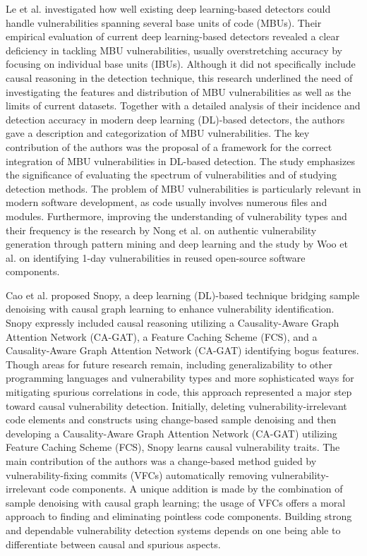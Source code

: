 \documentclass{buthesis}
\begin{document}
Le et al. \cite{Le2024MBU} investigated how well existing deep learning-based detectors could handle vulnerabilities spanning several base units of code (MBUs). Their empirical evaluation of current deep learning-based detectors revealed a clear deficiency in tackling MBU vulnerabilities, usually overstretching accuracy by focusing on individual base units (IBUs). Although it did not specifically include causal reasoning in the detection technique, this research underlined the need of investigating the features and distribution of MBU vulnerabilities as well as the limits of current datasets. Together with a detailed analysis of their incidence and detection accuracy in modern deep learning (DL)-based detectors, the authors gave a description and categorization of MBU vulnerabilities. The key contribution of the authors was the proposal of a framework for the correct integration of MBU vulnerabilities in DL-based detection. The study emphasizes the significance of evaluating the spectrum of vulnerabilities and of studying detection methods. The problem of MBU vulnerabilities is particularly relevant in modern software development, as code usually involves numerous files and modules. Furthermore, improving the understanding of vulnerability types and their frequency is the research by Nong et al. \cite{Nong2023ICSE} on authentic vulnerability generation through pattern mining and deep learning and the study by Woo et al. \cite{Woo2023USENIX} on identifying 1-day vulnerabilities in reused open-source software components.

Cao et al. \cite{Cao2024ASE} proposed Snopy, a deep learning (DL)-based technique bridging sample denoising with causal graph learning to enhance vulnerability identification. Snopy expressly included causal reasoning utilizing a Causality-Aware Graph Attention Network (CA-GAT), a Feature Caching Scheme (FCS), and a Causality-Aware Graph Attention Network (CA-GAT) identifying bogus features. Though areas for future research remain, including generalizability to other programming languages and vulnerability types \cite{Woo2023USENIX} and more sophisticated ways for mitigating spurious correlations in code, this approach represented a major step toward causal vulnerability detection. Initially, deleting vulnerability-irrelevant code elements and constructs using change-based sample denoising and then developing a Causality-Aware Graph Attention Network (CA-GAT) utilizing Feature Caching Scheme (FCS), Snopy learns causal vulnerability traits. The main contribution of the authors was a change-based method guided by vulnerability-fixing commits (VFCs) automatically removing vulnerability-irrelevant code components. A unique addition is made by the combination of sample denoising with causal graph learning; the usage of VFCs offers a moral approach to finding and eliminating pointless code components. Building strong and dependable vulnerability detection systems depends on one being able to differentiate between causal and spurious aspects.
\end{document}
